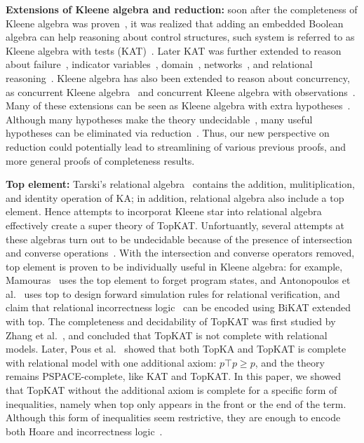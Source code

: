 \textbf{Extensions of Kleene algebra and reduction:}
soon after the completeness of Kleene algebra was proven~\cite{Kozen_1994},
it was realized that adding an embedded Boolean algebra can help reasoning
about control structures, such system is referred to as
Kleene algebra with tests (KAT)~\cite{Kozen_Smith_1997,Cohen_Kozen_Smith_1999}.
Later KAT was further extended to reason about failure~\cite{Mamouras_2017},
indicator variables~\cite{Grathwohl_Kozen_Mamouras_2014},
domain~\cite{Desharnais_Möller_Struth_2006}, networks~\cite{Anderson_Foster_Guha_Jeannin_Kozen_Schlesinger_Walker_2014},
and relational reasoning~\cite{Antonopoulos_Koskinen_Le_Nagasamudram_Naumann_Ngo_2022}.
Kleene algebra has also been extended to reason about 
concurrency, as concurrent Kleene algebra~\cite{Hoare_van_Staden_Möller_Struth_Zhu_2016, Kappé_Brunet_Silva_Zanasi_2018}
and concurrent Kleene algebra with observations~\cite{Kappé_Brunet_Silva_Wagemaker_Zanasi_2020}.
Many of these extensions can be seen as Kleene algebra with extra hypotheses~\cite{Cohen_1995,Doumane_Kuperberg_Pous_Pradic_2019}.
Although many hypotheses make the theory undecidable~\cite{Kozen_1996,Kozen_2002,Doumane_Kuperberg_Pous_Pradic_2019},
many useful hypotheses can be eliminated via reduction~\cite{Pous_Rot_Wagemaker_2021}.
Thus, our new perspective on reduction could potentially lead to streamlining of various previous proofs, 
and more general proofs of completeness results.

\textbf{Top element:}
Tarski's relational algebra~\cite{tarski_CalculusRelations_1941} contains the addition, 
mulitiplication, and identity operation of KA;  
in addition, relational algebra also include a top element. 
Hence attempts to incorporat Kleene star into relational algebra 
effectively create a super theory of TopKAT.
Unfortuantly, several attempts at these algebras turn out to be undecidable
because of the presence of intersection and 
converse operations~\cite{andrekaAxiomatizabilityPositiveAlgebras2011, pous_PositiveCalculusRelations_2018}.
With the intersection and converse operators removed, 
top element is proven to be individually useful in Kleene algebra:
for example, Mamouras~\cite{Mamouras_2017} uses the top element to forget program states,
and Antonopoulos et al.~\cite{Antonopoulos_Koskinen_Le_Nagasamudram_Naumann_Ngo_2022} 
uses top to design forward simulation rules for relational verification, 
and claim that relational incorrectness logic~\cite{murray_UnderApproximateRelationalLogic_2020a} 
can be encoded using BiKAT extended with top.
The completeness and decidability of TopKAT was first studied by Zhang et al.~\cite{Zhang_de_Amorim_Gaboardi_2022},
and concluded that TopKAT is not complete with relational models.
Later, Pous et al.~\cite{Pous_Wagemaker_2022,Pous_Wagemaker_2023} showed that 
both TopKA and TopKAT is complete with relational model with one additional axiom: \(p ⊤ p ≥ p\),
and the theory remains PSPACE-complete, like KAT and TopKAT.
In this paper, we showed that TopKAT without the additional axiom is complete 
for a specific form of inequalities, namely when top only appears in the front or the end of the term.
Although this form of inequalities seem restrictive, 
they are enough to encode both Hoare and incorrectness logic~\cite{Zhang_de_Amorim_Gaboardi_2022}.

